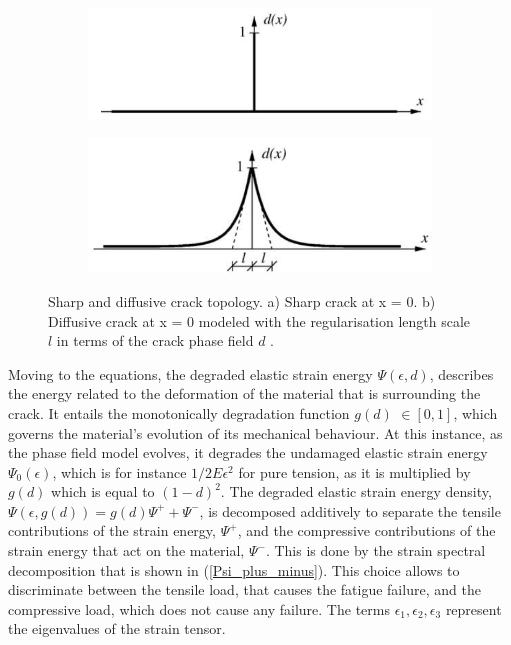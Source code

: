 \documentclass[11pt,a4paper]{article}
\begin{document}
\begin{figure} [ht]
\begin{subfigure}{0.5\textwidth}
\includegraphics[scale=0.65, center]{sharp.png}
\caption{}
\label{sharp}
\end{subfigure}
\begin{subfigure}{0.4\textwidth}
\includegraphics[scale=0.65, center]{diffusive.png}
\vspace{-7mm}
\caption{}
\label{diffusive}
\end{subfigure}
\caption{Sharp and diffusive crack topology. a) Sharp crack at x = 0. b) Diffusive crack at x = 0 modeled with the regularisation length scale $l$ in terms of the crack phase field $d$ \cite{miehe2010phase}.} 
\label{sharp_crack}
\end{figure}

\noindent Moving to the equations, the degraded elastic strain energy $\Psi(\epsilon,d)$, describes the energy related to the deformation of the material that is surrounding the crack. It entails the monotonically degradation function $g(d)$ $\in[0,1]$, which governs the material’s evolution of its mechanical behaviour. At this instance, as the phase field model evolves, it degrades the undamaged elastic strain energy $\Psi_0 (\epsilon)$, which is for instance $1/2 E \epsilon^2$ for pure tension, as it is multiplied by $g(d)$ which is equal to $(1-d)^2$. The degraded elastic strain energy density, $\Psi(\epsilon,g(d)) = g(d) \Psi^+ + \Psi^-$, is decomposed additively to separate the tensile contributions of the strain energy, $\Psi^+$, and the compressive contributions of the strain energy that act on the material, $\Psi^-$. This is done by the strain spectral decomposition that is shown in (\ref{Psi_plus_minus}). This choice allows to discriminate between the tensile load, that causes the fatigue failure, and the compressive load, which does not cause any failure. The terms $\epsilon_{1}, \epsilon_2, \epsilon_3$ represent the eigenvalues of the strain tensor.
\end{document}
